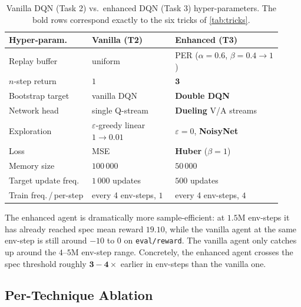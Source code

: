 \documentclass[10pt,twocolumn,letterpaper]{article}
\begin{document}
\begin{table}[h]
    \centering
    \scriptsize
    \setlength{\tabcolsep}{3pt}
    \begin{tabular}{@{}p{0.28\linewidth}p{0.28\linewidth}p{0.36\linewidth}@{}}
        \toprule
        \textbf{Hyper-param.}        & \textbf{Vanilla (T2)} & \textbf{Enhanced (T3)} \\ \midrule
        Replay buffer                & uniform               & PER ($\alpha{=}0.6$, $\beta{=}0.4{\to}1$) \\
        $n$-step return              & $1$                   & $\mathbf{3}$ \\
        Bootstrap target             & vanilla DQN           & \textbf{Double DQN} \\
        Network head                 & single Q-stream       & \textbf{Dueling} V/A streams \\
        Exploration                  & $\varepsilon$-greedy linear $1{\to}0.01$ & $\varepsilon{=}0$, \textbf{NoisyNet} \\
        Loss                         & MSE                   & \textbf{Huber} ($\beta{=}1$) \\
        Memory size                  & $100\,000$            & $50\,000$ \\
        Target update freq.          & $1\,000$ updates      & $500$ updates \\
        Train freq.\,/\,per-step     & every 4 env-steps, $1$ & every 4 env-steps, $4$ \\
        \bottomrule
    \end{tabular}
    \caption{Vanilla DQN (Task 2) vs.\ enhanced DQN (Task 3) hyper-parameters. The bold rows correspond exactly to the six tricks of \cref{tab:tricks}.}
    \label{tab:vanilla_vs_enhanced}
\end{table}

The enhanced agent is dramatically more sample-efficient: at $1.5$M env-steps it has already reached spec mean reward $19.10$, while the vanilla agent at the same env-step is still around $-10$ to $0$ on \texttt{eval/reward}. The vanilla agent only catches up around the $4$--$5$M env-step range. Concretely, the enhanced agent crosses the spec threshold roughly $\mathbf{3{-}4{\times}}$ earlier in env-steps than the vanilla one.

\subsection{Per-Technique Ablation}
\end{document}
